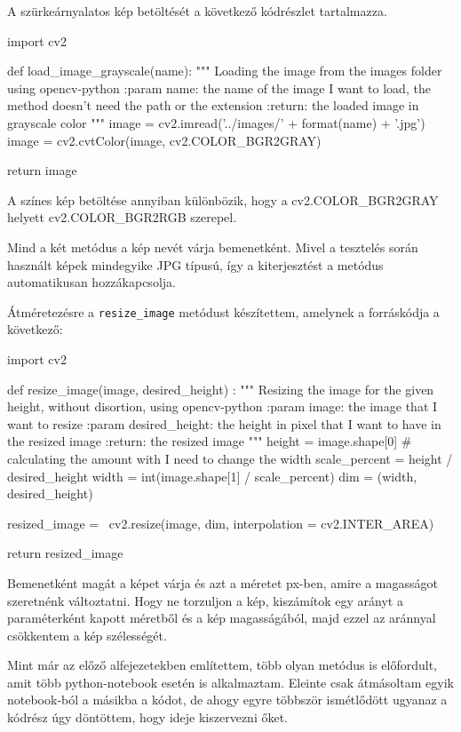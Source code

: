 A szürkeárnyalatos kép betöltését a következő kódrészlet tartalmazza.
\begin{python}
import cv2

def load_image_grayscale(name):
    """
    Loading the image from the images folder using opencv-python
    :param name: the name of the image I want to load,
        the method doesn't need the path or the extension
    :return: the loaded image in grayscale color
    """
    image = cv2.imread('../images/' + format(name) + '.jpg')
    image = cv2.cvtColor(image, cv2.COLOR_BGR2GRAY)

    return image
\end{python}
A színes kép betöltése annyiban különbözik, hogy a cv2.COLOR\_BGR2GRAY helyett cv2.COLOR\_BGR2RGB szerepel.

Mind a két metódus a kép nevét várja bemenetként. Mivel a tesztelés során használt képek mindegyike JPG típusú, így a kiterjesztést a metódus automatikusan hozzákapcsolja.


Átméretezésre a \texttt{resize\_image} metódust készítettem, amelynek a forráskódja a következő:
\begin{python}
import cv2

def resize_image(image, desired_height) :
    """
    Resizing the image for the given height,
    without disortion, using opencv-python
    :param image: the image that I want to resize
    :param desired_height: the height in pixel that
        I want to have in the resized image
    :return: the resized image
    """
    height = image.shape[0]
    # calculating the amount with I need to change the width
    scale_percent = height / desired_height
    width = int(image.shape[1] / scale_percent)
    dim = (width, desired_height)

    resized_image = \
        cv2.resize(image, dim, interpolation = cv2.INTER_AREA)

    return resized_image
\end{python}
Bemenetként magát a képet várja és azt a méretet px-ben, amire a magasságot szeretnénk változtatni. Hogy ne torzuljon a kép, kiszámítok egy arányt a paraméterként kapott méretből és a kép magasságából, majd ezzel az aránnyal csökkentem a kép szélességét.


Mint már az előző alfejezetekben említettem, több olyan metódus is előfordult, amit több python-notebook esetén is alkalmaztam. Eleinte csak átmásoltam egyik notebook-ból a másikba a kódot, de ahogy egyre többször ismétlődött ugyanaz a kódrész úgy döntöttem, hogy ideje kiszervezni őket.

